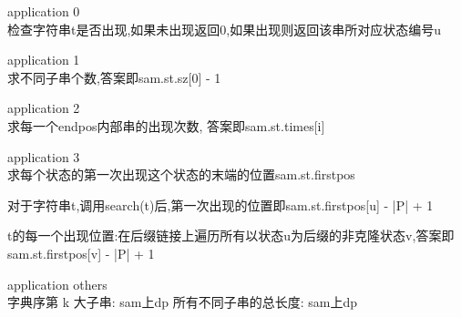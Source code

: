 \item application 0\\
检查字符串t是否出现,如果未出现返回0,如果出现则返回该串所对应状态编号u

\item application 1\\
求不同子串个数,答案即sam.st.sz[0] - 1

\item application 2\\
求每一个endpos内部串的出现次数, 答案即sam.st.times[i]

\item application 3\\
求每个状态的第一次出现这个状态的末端的位置sam.st.firstpos

对于字符串t,调用search(t)后,第一次出现的位置即sam.st.firstpos[u] - |P| + 1

t的每一个出现位置:在后缀链接上遍历所有以状态u为后缀的非克隆状态v,答案即{sam.st.firstpos[v] - |P| + 1}

\item application others\\
字典序第 k 大子串: sam上dp
所有不同子串的总长度: sam上dp
